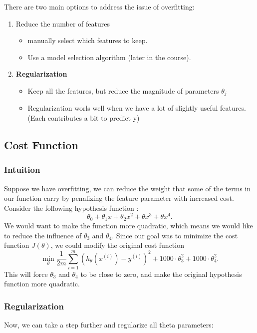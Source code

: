         There are two main options to address the issue of overfitting:
            \begin{enumerate}
                \item Reduce the number of features
                    \begin{itemize}
                        \item manually select which features to keep.
                        \item Use a model selection algorithm (later in the course).
                    \end{itemize}
                \item \textbf{Regularization}
                    \begin{itemize}
                        \item Keep all the features, but reduce the magnitude of parameters $\theta_j$
                        \item Regularization worls well when we have a lot of slightly useful features. (Each contributes a bit to predict y)
                    \end{itemize}
            \end{enumerate}


    \subsection{Cost Function}
        \subsubsection{Intuition}
            Suppose we have overfitting, we can reduce the weight that some of the terms in our function carry by penalizing the feature parameter with increased cost. Consider the following hypothesis function : \[
            \theta_0 + \theta_1 x + \theta_2 x^2 + \theta x^3 + \theta x^4
        .\] We would want to make the function more quadratic, which means we would like to reduce the influence of $\theta_3$ and $\theta_4$. Since our goal was to minimize the cost function $J(\theta)$, we could modify the original cost function \[
            \min_\theta \frac{1}{2m} \sum_{i=1}^{m} ( h_\theta (x^{(i)}) - y^{(i)} )^2 + 1000\cdot \theta_3^2 + 1000\cdot \theta_4^2
        .\] This will force $\theta_3$ and $\theta_4$ to be close to zero, and make the original hypothesis function more quadratic.

        \subsubsection{Regularization}
            Now, we can take a step further and regularize all theta parameters: 

